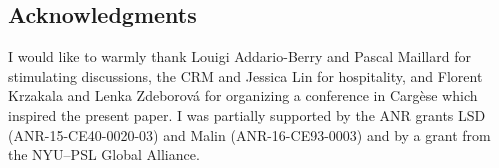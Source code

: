 \documentclass[AHL,Unicode,longabstracts,published]{cedram}
\newcommand{\1}{\mathds{1}}
\begin{document}
\subsection*{Acknowledgments}
I would like to warmly thank Louigi Addario-Berry and Pascal Maillard for stimulating discussions, the CRM and Jessica Lin for hospitality, and Florent Krzakala and Lenka Zdeborová for organizing a conference in Cargèse which inspired the present paper. I was partially supported by the ANR grants LSD (ANR-15-CE40-0020-03) and Malin (ANR-16-CE93-0003) and by a grant from the NYU--PSL Global Alliance.




\end{document}

